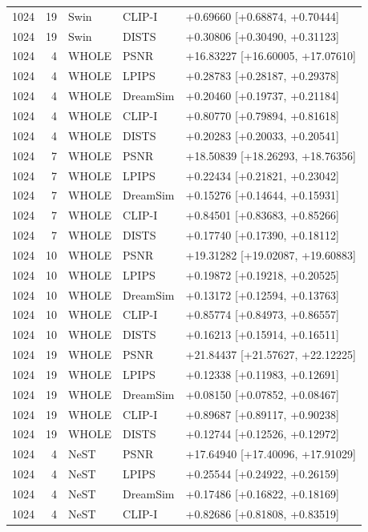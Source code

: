 \documentclass[10pt,letterpaper]{article}
\begin{document}
\begin{longtable}{@{}rrlll@{}}
1024 & 19 & Swin & CLIP-I & +0.69660 [+0.68874, +0.70444]\\
1024 & 19 & Swin & DISTS & +0.30806 [+0.30490, +0.31123]\\
1024 & 4 & WHOLE & PSNR & +16.83227 [+16.60005, +17.07610]\\
1024 & 4 & WHOLE & LPIPS & +0.28783 [+0.28187, +0.29378]\\
1024 & 4 & WHOLE & DreamSim & +0.20460 [+0.19737, +0.21184]\\
1024 & 4 & WHOLE & CLIP-I & +0.80770 [+0.79894, +0.81618]\\
1024 & 4 & WHOLE & DISTS & +0.20283 [+0.20033, +0.20541]\\
1024 & 7 & WHOLE & PSNR & +18.50839 [+18.26293, +18.76356]\\
1024 & 7 & WHOLE & LPIPS & +0.22434 [+0.21821, +0.23042]\\
1024 & 7 & WHOLE & DreamSim & +0.15276 [+0.14644, +0.15931]\\
1024 & 7 & WHOLE & CLIP-I & +0.84501 [+0.83683, +0.85266]\\
1024 & 7 & WHOLE & DISTS & +0.17740 [+0.17390, +0.18112]\\
1024 & 10 & WHOLE & PSNR & +19.31282 [+19.02087, +19.60883]\\
1024 & 10 & WHOLE & LPIPS & +0.19872 [+0.19218, +0.20525]\\
1024 & 10 & WHOLE & DreamSim & +0.13172 [+0.12594, +0.13763]\\
1024 & 10 & WHOLE & CLIP-I & +0.85774 [+0.84973, +0.86557]\\
1024 & 10 & WHOLE & DISTS & +0.16213 [+0.15914, +0.16511]\\
1024 & 19 & WHOLE & PSNR & +21.84437 [+21.57627, +22.12225]\\
1024 & 19 & WHOLE & LPIPS & +0.12338 [+0.11983, +0.12691]\\
1024 & 19 & WHOLE & DreamSim & +0.08150 [+0.07852, +0.08467]\\
1024 & 19 & WHOLE & CLIP-I & +0.89687 [+0.89117, +0.90238]\\
1024 & 19 & WHOLE & DISTS & +0.12744 [+0.12526, +0.12972]\\
1024 & 4 & NeST & PSNR & +17.64940 [+17.40096, +17.91029]\\
1024 & 4 & NeST & LPIPS & +0.25544 [+0.24922, +0.26159]\\
1024 & 4 & NeST & DreamSim & +0.17486 [+0.16822, +0.18169]\\
1024 & 4 & NeST & CLIP-I & +0.82686 [+0.81808, +0.83519]\\

\end{longtable}
\end{document}
